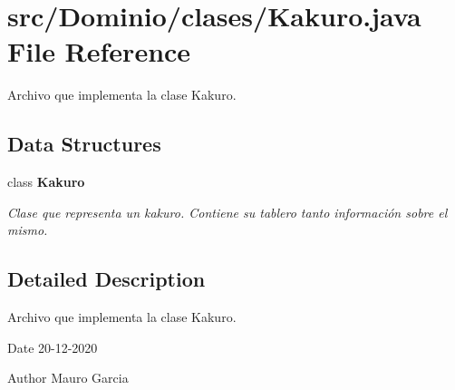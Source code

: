 \section{src/\+Dominio/clases/\+Kakuro.java File Reference}
\label{_kakuro_8java}


Archivo que implementa la clase Kakuro.  


\subsection*{Data Structures}
\begin{DoxyCompactItemize}
\item 
class \textbf{ Kakuro}
\begin{DoxyCompactList}\small\item\em Clase que representa un kakuro. Contiene su tablero tanto información sobre el mismo. \end{DoxyCompactList}\end{DoxyCompactItemize}


\subsection{Detailed Description}
Archivo que implementa la clase Kakuro. 

\begin{DoxyDate}{Date}
20-\/12-\/2020 
\end{DoxyDate}
\begin{DoxyAuthor}{Author}
Mauro Garcia 
\end{DoxyAuthor}
